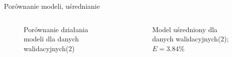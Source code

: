 \documentclass{beamer}
\begin{document}
\begin{frame}{Porównanie modeli, uśrednianie}
\begin{columns}
	\begin{figure}
		\centering
		\caption{Porównanie działania modeli dla danych walidacyjnych(2)}
	\end{figure}
	
	\begin{figure}
		\centering
		\caption{Model uśredniony dla danych walidacyjnych(2); $E = 3.84\%$}
	\end{figure}
\end{columns}
\end{frame}
\end{document}
